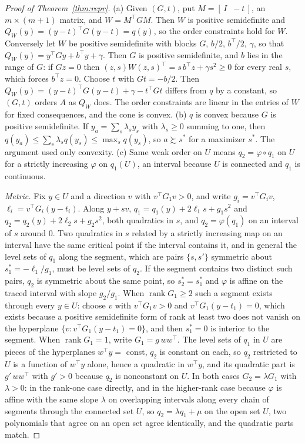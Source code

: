 \documentclass{article}
\theoremstyle{definition}
\theoremstyle{remark}
\begin{document}
\begin{proof}[Proof of Theorem~\ref{thm:repr}]
(a) Given $(G,t)$, put $M=[\,I\;\;-t\,]$, an $m\times(m+1)$ matrix, and $W=M^{\top}GM$.
Then $W$ is positive semidefinite and $Q_{W}(y)=(y-t)^{\top}G(y-t)=q(y)$, so the order constraints hold for $W$.
Conversely let $W$ be positive semidefinite with blocks $G$, $b/2$, $b^{\top}/2$, $\gamma$, so that $Q_{W}(y)=y^{\top}Gy+b^{\top}y+\gamma$.
Then $G$ is positive semidefinite, and $b$ lies in the range of $G$: if $Gz=0$ then $(z,s)W(z,s)^{\top}=s\,b^{\top}z+\gamma s^{2}\ge0$ for every real $s$, which forces $b^{\top}z=0$.
Choose $t$ with $Gt=-b/2$.
Then $Q_{W}(y)=(y-t)^{\top}G(y-t)+\gamma-t^{\top}Gt$ differs from $q$ by a constant, so $(G,t)$ orders $A$ as $Q_{W}$ does.
The order constraints are linear in the entries of $W$ for fixed consequences, and the cone is convex.
(b) $q$ is convex because $G$ is positive semidefinite.
If $y_{a}=\sum_{s}\lambda_{s}y_{s}$ with $\lambda_{s}\ge0$ summing to one, then $q(y_{a})\le\sum_{s}\lambda_{s}q(y_{s})\le\max_{s}q(y_{s})$, so $a\succsim s^{*}$ for a maximizer $s^{*}$.
The argument used only convexity.
(c) Same weak order on $U$ means $q_{2}=\varphi\circ q_{1}$ on $U$ for a strictly increasing $\varphi$ on $q_{1}(U)$, an interval because $U$ is connected and $q_{1}$ is continuous.

\emph{Metric.}
Fix $y\in U$ and a direction $v$ with $v^{\top}G_{1}v>0$, and write $g_{i}=v^{\top}G_{i}v$, $\ell_{i}=v^{\top}G_{i}(y-t_{i})$.
Along $y+sv$, $q_{1}=q_{1}(y)+2\ell_{1}s+g_{1}s^{2}$ and $q_{2}=q_{2}(y)+2\ell_{2}s+g_{2}s^{2}$, both quadratics in $s$, and $q_{2}=\varphi(q_{1})$ on an interval of $s$ around $0$.
Two quadratics in $s$ related by a strictly increasing map on an interval have the same critical point if the interval contains it, and in general the level sets of $q_{1}$ along the segment, which are pairs $\{s,s'\}$ symmetric about $s^{*}_{1}=-\ell_{1}/g_{1}$, must be level sets of $q_{2}$.
If the segment contains two distinct such pairs, $q_{2}$ is symmetric about the same point, so $s^{*}_{2}=s^{*}_{1}$ and $\varphi$ is affine on the traced interval with slope $g_{2}/g_{1}$.
When $\operatorname{rank}G_{1}\ge2$ such a segment exists through every $y\in U$: choose $v$ with $v^{\top}G_{1}v>0$ and $v^{\top}G_{1}(y-t_{1})=0$, which exists because a positive semidefinite form of rank at least two does not vanish on the hyperplane $\{v:v^{\top}G_{1}(y-t_{1})=0\}$, and then $s^{*}_{1}=0$ is interior to the segment.
When $\operatorname{rank}G_{1}=1$, write $G_{1}=g\,ww^{\top}$. The level sets of $q_{1}$ in $U$ are pieces of the hyperplanes $w^{\top}y=$ const, $q_{2}$ is constant on each, so $q_{2}$ restricted to $U$ is a function of $w^{\top}y$ alone, hence a quadratic in $w^{\top}y$, and its quadratic part is $g'\,ww^{\top}$ with $g'>0$ because $q_{2}$ is nonconstant on $U$.
In both cases $G_{2}=\lambda G_{1}$ with $\lambda>0$: in the rank-one case directly, and in the higher-rank case because $\varphi$ is affine with the same slope $\lambda$ on overlapping intervals along every chain of segments through the connected set $U$, so $q_{2}=\lambda q_{1}+\mu$ on the open set $U$, two polynomials that agree on an open set agree identically, and the quadratic parts match.


\end{proof}
\end{document}
